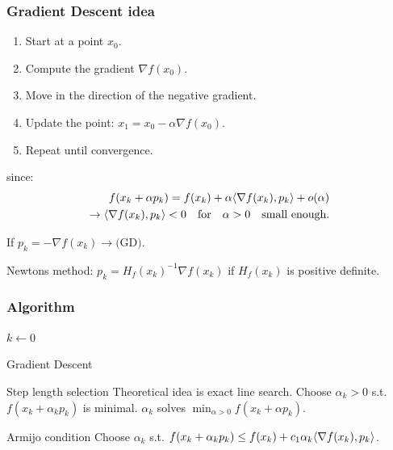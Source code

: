 \subsubsection*{Gradient Descent idea}
\begin{enumerate}
    \item Start at a point \( x_0 \).
    \item Compute the gradient \( \nabla f(x_0) \).
    \item Move in the direction of the negative gradient.
    \item Update the point: \( x_1 = x_0 - \alpha \nabla f(x_0) \).
    \item Repeat until convergence.
\end{enumerate}

since:
\begin{align*}
    f(x_k + \alpha p_k) = f(x_k) + \alpha \langle\nabla f(x_k), p_k\rangle + o(\alpha) \\
    \rightarrow \langle\nabla f(x_k), p_k\rangle < 0 \quad \text{for} \quad \alpha > 0 \quad \text{small enough}.
\end{align*}

\begin{example}{}{}
    If $p_k = - \nabla f(x_k) \rightarrow \text{(GD)}$.

    Newtons method: $p_k = H_f(x_k)^{-1} \nabla f(x_k)$ if $H_f(x_k)$ is positive definite.
\end{example}

\subsubsection*{Algorithm}
\begin{algorithm}[H]
\SetAlgoLined
{}
$k \gets 0$\;
\;
\caption{Gradient Descent}
\end{algorithm}

\begin{remark}{Step length selection}{}
    Theoretical idea is exact line search. Choose $\alpha_k > 0$ s.t. $f(x_k + \alpha_k p_k)$ is minimal.
    $\alpha_k$ solves $\min_{\alpha > 0} f(x_k + \alpha p_k)$.
\end{remark}

\begin{definition}{Armijo condition}{}
    Choose $\alpha_k$ s.t. $f(x_k + \alpha_k p_k) \leq f(x_k) + c_1 \alpha_k \langle\nabla f(x_k), p_k\rangle$.
\end{definition}

